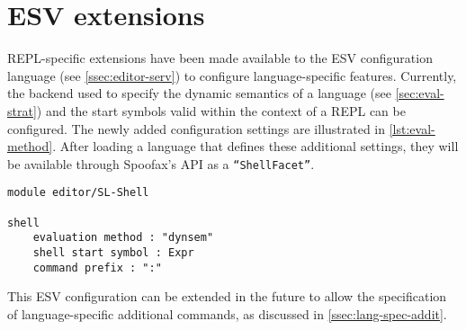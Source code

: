 \section{ESV extensions}
\label{sec:esv-extensions}

REPL-specific extensions have been made available to the ESV configuration
language (see \cref{ssec:editor-serv}) to configure language-specific
features. Currently, the backend used to specify the dynamic semantics of a
language (see \cref{sec:eval-strat}) and the start symbols valid within the
context of a REPL can be configured. The newly added configuration settings are
illustrated in \cref{lst:eval-method}. After loading a language that defines
these additional settings, they will be available through Spoofax's API as a
\texttt{``ShellFacet''}.

\begin{lstlisting}[language=esv,caption={Configuring language specific settings.},label={lst:eval-method}]
module editor/SL-Shell

shell
    evaluation method : "dynsem"
    shell start symbol : Expr
    command prefix : ":"
\end{lstlisting}

This ESV configuration can be extended in the future to allow the specification
of language-specific additional commands, as discussed in
\cref{ssec:lang-spec-addit}.


